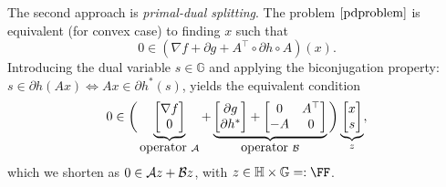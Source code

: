 {{{The second approach is \emph{primal-dual splitting}. %
}
The problem $\eqref{pdproblem}$ is equivalent (for convex case) to finding $x$ such that
\begin{equation}
0\in (\nabla f+\partial g+A^\top\circ\partial h\circ A)(x).
\end{equation}
Introducing the dual variable $s\in\mathbb{G}$ and applying the biconjugation property:  $s\in \partial h(Ax)\Leftrightarrow Ax\in \partial h^*(s)$, yields the  equivalent condition
\begin{equation}
0\in\bigg(\underbrace{\begin{bmatrix}
\nabla f\\
0
\end{bmatrix}}_{\mbox{operator}~\cA}+\underbrace{
\begin{bmatrix}
\partial g\\
\partial h^*
\end{bmatrix}+\begin{bmatrix}
0&A^\top\\
-A&0
\end{bmatrix}}_{\mbox{operator}~\cB}\bigg) \underbrace{\begin{bmatrix}
x\\
s
\end{bmatrix}}_{z},\label{pdkkt}
\end{equation}
which we shorten as $0\in{\mathcal{A}} z+{\mathcal{B}} z$, with $z\in\HH\times\GG=:\FF$.

}}
